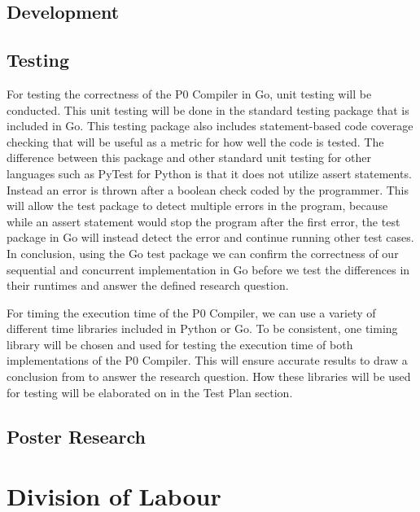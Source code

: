 \documentclass{article}
\begin{document}
\subsection{Development} %

\subsection{Testing} %

For testing the correctness of the P0 Compiler in Go, unit testing will be conducted. This unit testing will be done in the standard testing package that is
included in Go. This testing package also includes statement-based code coverage checking that will be useful as a metric for how well the code is tested.
The difference between this package and other standard unit testing for other languages such as PyTest for Python is that it does not utilize assert statements.
Instead an error is thrown after a boolean check coded by the programmer. This will allow the test package to detect multiple errors in the program, because
while an assert statement would stop the program after the first error, the test package in Go will instead detect the error and continue running other test cases.
In conclusion, using the Go test package we can confirm the correctness of our sequential and concurrent implementation in Go before we test the differences in their runtimes
and answer the defined research question.    

For timing the execution time of the P0 Compiler, we can use a variety of different time libraries included in Python or Go. To be consistent, one timing library 
will be chosen
and used for testing the execution time of both implementations of the P0 Compiler. This will ensure 
accurate results to draw a conclusion from to answer the research question. How these libraries will be used for testing will be elaborated on in the Test Plan section.

\subsection{Poster Research} %


\section{Division of Labour} %
\end{document}
